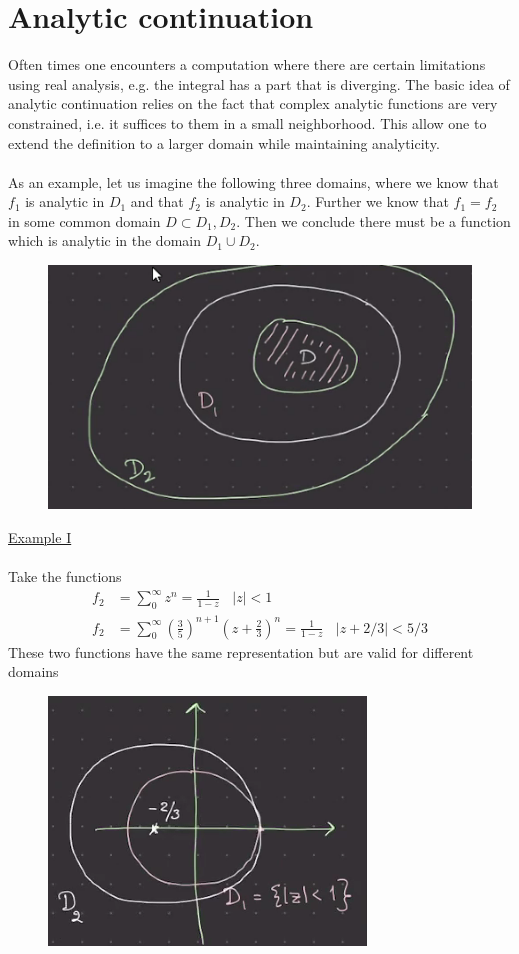 \documentclass[a4paper,12pt]{article}
\begin{document}
\section{Analytic continuation}
Often times one encounters a computation where there are certain limitations using real analysis, e.g. the integral has a part that is diverging. The basic idea of analytic continuation relies on the fact that complex analytic functions are very constrained, i.e. it suffices to them in a small neighborhood. This allow one to extend the definition to a larger domain while maintaining analyticity.
\\\\
As an example, let us imagine the following three domains, where we know that $f_1$ is analytic in $D_1$ and that $f_2$ is analytic in $D_2$. Further we know that $f_1=f_2$ in some common domain $D\subset D_1,D_2$. Then we conclude there must be a function which is analytic in the domain $D_1\cup D_2$.
\begin{figure}[H]
	\centering
	\includegraphics[width=0.5\linewidth]{17}
	\caption{}
	\label{fig:4}
\end{figure}
\underline{Example I}\\\\
Take the functions
\begin{equation}
\begin{aligned}
f_2&=\sum_0^{\infty}z^n=\frac{1}{1-z}~~~~|z|<1\\
f_2&=\sum_0^{\infty}\left(\frac{3}{5}\right)^{n+1}\left(z+\frac{2}{3}\right)^n=\frac{1}{1-z}~~~~|z+2/3|<5/3
\end{aligned}
\end{equation}
These two functions have the same representation but are valid for different domains
\begin{figure}[H]
	\centering
	\includegraphics[width=0.5\linewidth]{18}
	\caption{}
	\label{fig:4}
\end{figure}
\end{document}
